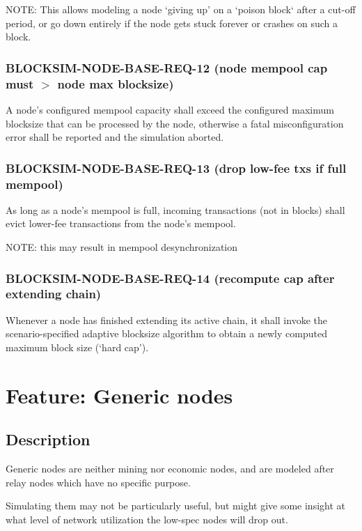 \documentclass{scrreprt}
\begin{document}
NOTE: This allows modeling a node `giving up' on a `poison block` after a
cut-off period, or go down entirely if the node gets stuck forever or crashes
on such a block.


\subsubsection{BLOCKSIM-NODE-BASE-REQ-12 (node mempool cap must $>$ node max blocksize)}

A node's configured mempool capacity shall exceed the configured
maximum blocksize that can be processed by the node, otherwise a fatal
misconfiguration error shall be reported and the simulation aborted.


\subsubsection{BLOCKSIM-NODE-BASE-REQ-13 (drop low-fee txs if full mempool)}

As long as a node's mempool is full, incoming transactions (not in blocks) shall
evict lower-fee transactions from the node's mempool.

NOTE: this may result in mempool desynchronization

\subsubsection{BLOCKSIM-NODE-BASE-REQ-14 (recompute cap after extending chain)}

Whenever a node has finished extending its active chain, it shall invoke
the scenario-specified adaptive blocksize algorithm to obtain a newly
computed maximum block size (`hard cap').


\section{Feature: Generic nodes}

\subsection{Description}

Generic nodes are neither mining nor economic nodes, and are modeled
after relay nodes which have no specific purpose.

Simulating them may not be particularly useful, but might give some
insight at what level of network utilization the low-spec nodes will
drop out.
\end{document}
